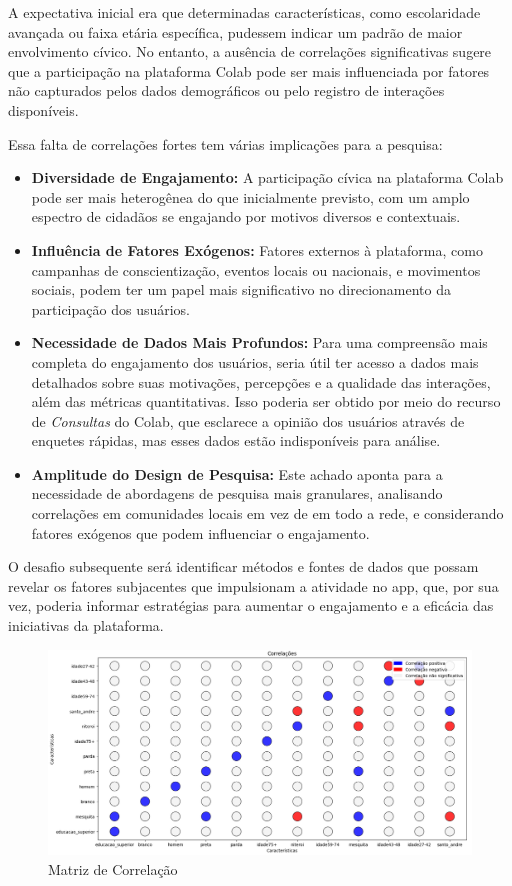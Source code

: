 A expectativa inicial era que determinadas características, como escolaridade avançada ou faixa etária específica, pudessem indicar um padrão de maior envolvimento cívico. No entanto, a ausência de correlações significativas sugere que a participação na plataforma Colab pode ser mais influenciada por fatores não capturados pelos dados demográficos ou pelo registro de interações disponíveis.

Essa falta de correlações fortes tem várias implicações para a pesquisa:

\begin{itemize}
	\item \textbf{Diversidade de Engajamento:} A participação cívica na plataforma Colab pode ser mais heterogênea do que inicialmente previsto, com um amplo espectro de cidadãos se engajando por motivos diversos e contextuais.
	\item \textbf{Influência de Fatores Exógenos:} Fatores externos à plataforma, como campanhas de conscientização, eventos locais ou nacionais, e movimentos sociais, podem ter um papel mais significativo no direcionamento da participação dos usuários.
	\item \textbf{Necessidade de Dados Mais Profundos:} Para uma compreensão mais completa do engajamento dos usuários, seria útil ter acesso a dados mais detalhados sobre suas motivações, percepções e a qualidade das interações, além das métricas quantitativas. Isso poderia ser obtido por meio do recurso de \textit{Consultas} do Colab, que esclarece a opinião dos usuários através de enquetes rápidas, mas esses dados estão indisponíveis para análise.
	\item \textbf{Amplitude do Design de Pesquisa:} Este achado aponta para a necessidade de abordagens de pesquisa mais granulares, analisando correlações em comunidades locais em vez de em todo a rede, e considerando fatores exógenos que podem influenciar o engajamento.
\end{itemize}

O desafio subsequente será identificar métodos e fontes de dados que possam revelar os fatores subjacentes que impulsionam a atividade no app, que, por sua vez, poderia informar estratégias para aumentar o engajamento e a eficácia das iniciativas da plataforma.

\begin{figure}[!htb]
	\caption{Matriz de Correlação}
	\label{fig:colab_correlation_bingo}
	\centering
	\includegraphics[scale=0.4]{images/colab_correlation_bingo.png}
\end{figure}

